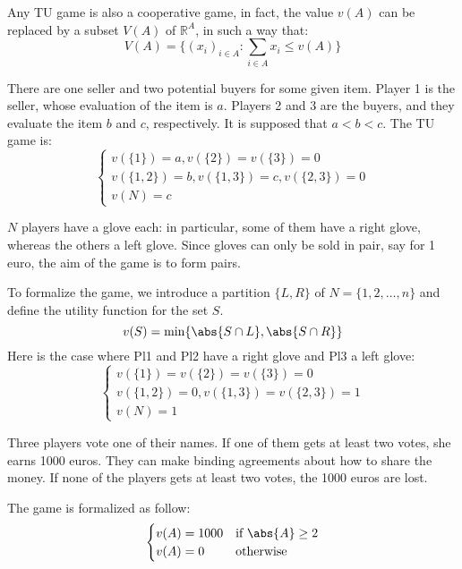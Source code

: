 \documentclass[../main.tex]{subfiles}
\begin{document}
Any \gls{TU} game is also a cooperative game, in fact, the value $v(A)$ can be replaced by a subset $V(A)$ of $\mathbb{R}^A$, in such a way that:
\[
    V(A) = \{ (x_i)_{i \in A} : \sum_{i \in A} x_i \leq v(A)\}
\]
\begin{example}
    \label{ex:seller-buyers}
    There are one seller and two potential buyers for some given item. Player 1 is the seller, whose evaluation of the item is $a$. Players 2 and 3 are the buyers, and they evaluate the item $b$ and $c$, respectively. It is supposed that $a <b <c$. The \gls{TU} game is:
    \[
        \begin{cases}
            v(\{1\}) = a, v(\{2\}) = v(\{3\}) = 0          \\
            v(\{1,2\}) = b, v(\{1,3\}) = c, v(\{2,3\}) = 0 \\
            v(N) = c
        \end{cases}
    \]
\end{example}
\begin{example}
    $N$ players have a glove each: in particular, some of them have a right glove, whereas the others a left glove. Since gloves can only be sold in pair, say for 1 euro, the aim of the game is to form pairs.

    To formalize the game, we introduce a partition $\{L,R\}$ of $N= \{1,2,\ldots,n\}$ and define the utility function for the set $S$.
    \[
        v(S) = \min \{\abs{S \cap L}, \abs{S \cap R}\}
    \]
    Here is the case where Pl1 and Pl2 have a right glove and Pl3 a left glove:
    \[
        \begin{cases}
            v(\{1\}) = v(\{2\}) = v(\{3\}) = 0          \\
            v(\{1,2\}) = 0, v(\{1,3\}) = v(\{2,3\}) = 1 \\
            v(N) = 1
        \end{cases}
    \]
\end{example}
\begin{example}
    Three players vote one of their names. If one of them gets at least two votes, she earns 1000 euros. They can make binding agreements about how to share the money. If none of the players gets at least two votes, the 1000 euros are lost.

    The game is formalized as follow:
    \[
        \begin{cases}
            v(A) = 1000 & \text{if } \abs{A} \geq 2 \\
            v(A) = 0    & \text{otherwise}
        \end{cases}
    \]
\end{example}
\end{document}
